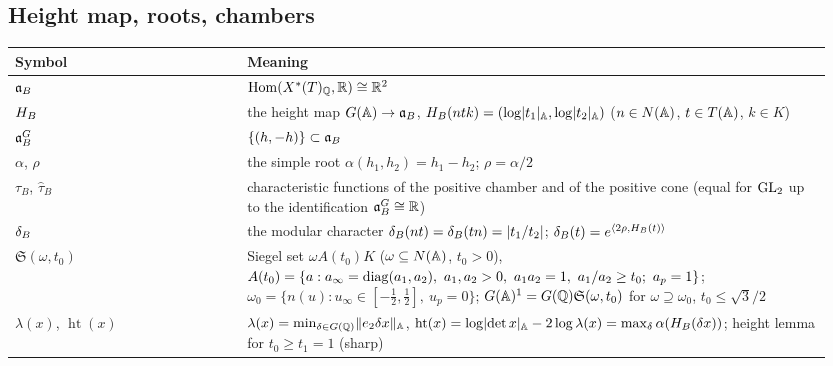 \subsection*{Height map, roots, chambers}
\begin{longtable}{@{}p{0.27\linewidth}p{0.68\linewidth}@{}}
\toprule
Symbol & Meaning \\ \midrule
\endhead
$\mathfrak{a}_B$ & $\operatorname{Hom}(X^*(T)_{\mathbb{Q}},\mathbb{R})\cong\mathbb{R}^2$ \\
$H_B$ & the height map $G(\mathbb{A})\to\mathfrak{a}_B$, $H_B(ntk)=(\log\lvert t_1\rvert_{\mathbb{A}},\log\lvert t_2\rvert_{\mathbb{A}})$
  ($n\in N(\mathbb{A})$, $t\in T(\mathbb{A})$, $k\in K$) \\
$\mathfrak{a}_B^G$ & $\{(h,-h)\}\subset\mathfrak{a}_B$ \\
$\alpha$, $\rho$ & the simple root $\alpha(h_1,h_2)=h_1-h_2$; $\rho=\alpha/2$ \\
$\tau_B$, $\hat\tau_B$ & characteristic functions of the positive chamber and of the positive cone
  (equal for $\mathrm{GL}_2$ up to the identification $\mathfrak{a}_B^G\cong\mathbb{R}$) \\
$\delta_B$ & the modular character $\delta_B(nt)=\delta_B(tn)=\lvert t_1/t_2\rvert$; $\delta_B(t)=e^{\langle2\rho,H_B(t)\rangle}$ \\
$\mathfrak S(\omega,t_0)$ & Siegel set $\omega A(t_0)K$ ($\omega\subseteq N(\mathbb{A})$, $t_0>0$), $A(t_0)=\{a:a_\infty=\diag(a_1,a_2),\ a_1,a_2>0,\
  a_1a_2=1,\ a_1/a_2\ge t_0;\ a_p=1\}$; $\omega_0=\{n(u):u_\infty\in[-\frac12,\frac12],\ u_p=0\}$;
  $G(\mathbb{A})^1=G(\mathbb{Q})\mathfrak S(\omega,t_0)$ for $\omega\supseteq\omega_0$, $t_0\le\sqrt3/2$ \\
$\lambda(x)$, $\operatorname{ht}(x)$ & $\lambda(x)=\min_{\delta\in G(\mathbb{Q})}\lVert e_2\delta x\rVert_{\mathbb{A}}$,
  $\operatorname{ht}(x)=\log\lvert\det x\rvert_{\mathbb{A}}-2\log\lambda(x)=\max_\delta\alpha(H_B(\delta x))$; height lemma for $t_0\ge t_1=1$ (sharp) \\
\bottomrule
\end{longtable}

